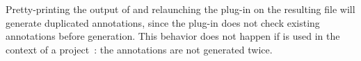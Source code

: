 Pretty-printing the output of \rte{} and relaunching the plug-in on the
resulting file will generate duplicated annotations, since the plug-in does not
check existing annotations before generation. This behavior does not happen if
\rte{} is used in the context of a \framac{} project~\cite{framacdev}: the
annotations are not generated twice.




\cleardoublepage
{}
{}


